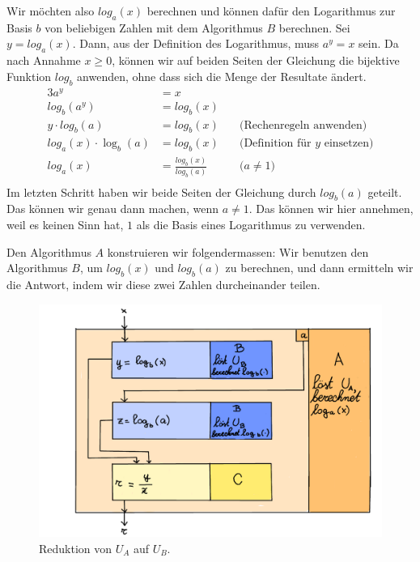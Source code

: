 \documentclass[
	12pt, %
	german, %
]{fphw}
\begin{document}
Wir möchten also \(log_a(x)\) berechnen und können dafür den Logarithmus zur Basis \(b\) von beliebigen Zahlen mit dem Algorithmus \(B\) berechnen. Sei \(y = log_a(x)\). Dann, aus der Definition des Logarithmus, muss \(a^y = x\) sein. Da nach Annahme \(x \geq 0 \), können wir auf beiden Seiten der Gleichung die bijektive Funktion \(log_b\) anwenden, ohne dass sich die Menge der Resultate ändert.
\begin{alignat*}{3}
a^y &= x & \\
log_b(a^y) &= log_b(x) & \\
y \cdot log_b(a) &= log_b(x) & \quad \text{(Rechenregeln anwenden)} \\
log_a(x) \cdot \log_b(a) &= log_b(x) & \quad \text{(Definition für \(y\) einsetzen)}\\
log_a(x) &= \frac{log_b(x)}{log_b(a)} & \quad \text{(\(a \neq 1\))}\\
\end{alignat*}
Im letzten Schritt haben wir beide Seiten der Gleichung durch \(log_b(a)\) geteilt. Das können wir genau dann machen, wenn \(a \neq 1\). Das können wir hier annehmen, weil es keinen Sinn hat, \(1\) als die Basis eines Logarithmus zu verwenden.

Den Algorithmus \(A\) konstruieren wir folgendermassen: Wir benutzen den Algorithmus \(B\), um \(log_b(x)\) und \(log_b(a)\) zu berechnen, und dann ermitteln wir die Antwort, indem wir diese zwei Zahlen durcheinander teilen.

\begin{figure}[H]
	\centering
	\includegraphics[width=\textwidth]{Positiv.png}
	\caption{Reduktion von \(U_A\) auf \(U_B\).}
\end{figure}
\end{document}
